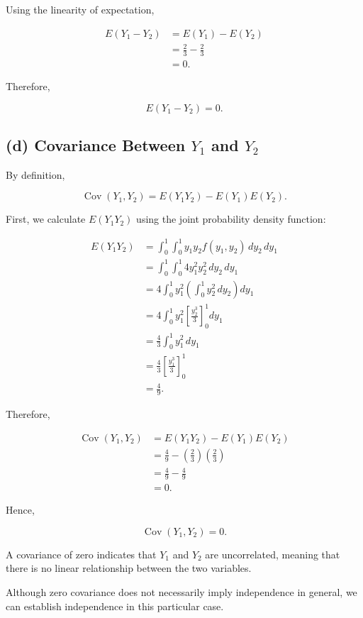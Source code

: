 \documentclass[11pt, a4paper]{article}
\begin{document}
Using the linearity of expectation,

\begin{align*}
E(Y_1-Y_2)
&= E(Y_1)-E(Y_2)\\
&= \frac{2}{3}-\frac{2}{3}\\
&= 0.
\end{align*}

Therefore,

\[
E(Y_1-Y_2)=0.
\]

\subsection{(d) Covariance Between $Y_1$ and $Y_2$}

By definition,

\[
\operatorname{Cov}(Y_1,Y_2)
= E(Y_1Y_2)-E(Y_1)E(Y_2).
\]

First, we calculate $E(Y_1Y_2)$ using the
joint probability density function:

\begin{align*}
E(Y_1Y_2)
&= \int_0^1\int_0^1
y_1y_2 f(y_1,y_2)\,dy_2\,dy_1\\
&= \int_0^1\int_0^1
4y_1^2y_2^2\,dy_2\,dy_1\\
&= 4\int_0^1 y_1^2
\left(\int_0^1 y_2^2\,dy_2\right)dy_1\\
&= 4\int_0^1 y_1^2
\left[\frac{y_2^3}{3}\right]_0^1dy_1\\
&= \frac{4}{3}\int_0^1 y_1^2\,dy_1\\
&= \frac{4}{3}
\left[\frac{y_1^3}{3}\right]_0^1\\
&= \frac{4}{9}.
\end{align*}

Therefore,

\begin{align*}
\operatorname{Cov}(Y_1,Y_2)
&= E(Y_1Y_2)-E(Y_1)E(Y_2)\\
&= \frac{4}{9}
-\left(\frac{2}{3}\right)\left(\frac{2}{3}\right)\\
&= \frac{4}{9}-\frac{4}{9}\\
&= 0.
\end{align*}

Hence,

\[
\operatorname{Cov}(Y_1,Y_2)=0.
\]

A covariance of zero indicates that $Y_1$ and $Y_2$
are uncorrelated, meaning that there is no linear
relationship between the two variables.

Although zero covariance does not necessarily imply
independence in general, we can establish independence
in this particular case.
\end{document}
